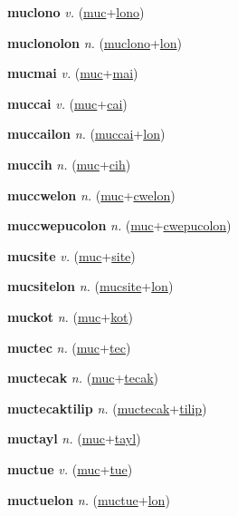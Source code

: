 \textbf{\hypertarget{muclono}{muclono}} \textit{v.} (\hyperlink{muc}{muc}+\allowbreak \hyperlink{lono}{lono})


\textbf{\hypertarget{muclonolon}{muclonolon}} \textit{n.} (\hyperlink{muclono}{muclono}+\allowbreak \hyperlink{lon}{lon})


\textbf{\hypertarget{mucmai}{mucmai}} \textit{v.} (\hyperlink{muc}{muc}+\allowbreak \hyperlink{mai}{mai})


\textbf{\hypertarget{muccai}{muccai}} \textit{v.} (\hyperlink{muc}{muc}+\allowbreak \hyperlink{cai}{cai})


\textbf{\hypertarget{muccailon}{muccailon}} \textit{n.} (\hyperlink{muccai}{muccai}+\allowbreak \hyperlink{lon}{lon})


\textbf{\hypertarget{muccih}{muccih}} \textit{n.} (\hyperlink{muc}{muc}+\allowbreak \hyperlink{cih}{cih})


\textbf{\hypertarget{muccwelon}{muccwelon}} \textit{n.} (\hyperlink{muc}{muc}+\allowbreak \hyperlink{cwelon}{cwelon})


\textbf{\hypertarget{muccwepucolon}{muccwepucolon}} \textit{n.} (\hyperlink{muc}{muc}+\allowbreak \hyperlink{cwepucolon}{cwepucolon})


\textbf{\hypertarget{mucsite}{mucsite}} \textit{v.} (\hyperlink{muc}{muc}+\allowbreak \hyperlink{site}{site})


\textbf{\hypertarget{mucsitelon}{mucsitelon}} \textit{n.} (\hyperlink{mucsite}{mucsite}+\allowbreak \hyperlink{lon}{lon})


\textbf{\hypertarget{muckot}{muckot}} \textit{n.} (\hyperlink{muc}{muc}+\allowbreak \hyperlink{kot}{kot})


\textbf{\hypertarget{muctec}{muctec}} \textit{n.} (\hyperlink{muc}{muc}+\allowbreak \hyperlink{tec}{tec})


\textbf{\hypertarget{muctecak}{muctecak}} \textit{n.} (\hyperlink{muc}{muc}+\allowbreak \hyperlink{tecak}{tecak})


\textbf{\hypertarget{muctecaktilip}{muctecaktilip}} \textit{n.} (\hyperlink{muctecak}{muctecak}+\allowbreak \hyperlink{tilip}{tilip})


\textbf{\hypertarget{muctayl}{muctayl}} \textit{n.} (\hyperlink{muc}{muc}+\allowbreak \hyperlink{tayl}{tayl})


\textbf{\hypertarget{muctue}{muctue}} \textit{v.} (\hyperlink{muc}{muc}+\allowbreak \hyperlink{tue}{tue})


\textbf{\hypertarget{muctuelon}{muctuelon}} \textit{n.} (\hyperlink{muctue}{muctue}+\allowbreak \hyperlink{lon}{lon})


